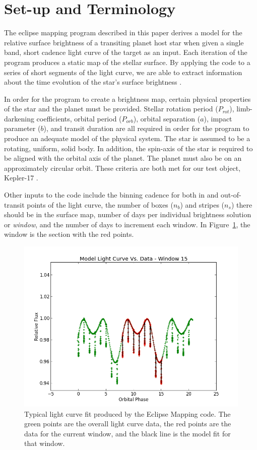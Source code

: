 

\section{Set-up and Terminology \label{terminology}}
The eclipse mapping program described in this paper derives a model for the relative surface brightness of a transiting planet host star when given a single band, short cadence light curve of the target as an input. Each iteration of the program produces a static map of the stellar surface. By applying the code to a series of short segments of the light curve, we are able to extract information about the time evolution of the star's surface brightness \citep{Huber2009}.  

In order for the program to create a brightness map, certain physical properties of the star and the planet must be provided. Stellar rotation period ($P_{rot}$), limb-darkening coefficients, orbital period ($P_{orb}$), orbital separation ($a$), impact parameter ($b$), and transit duration are all required in order for the program to produce an adequate model of the physical system. The star is assumed to be a rotating, uniform, solid body. In addition, the spin-axis of the star is required to be aligned with the orbital axis of the planet. The planet must also be on an approximately circular orbit. These criteria are both met for our test object, Kepler-17 \citep{Borucki2011}.

Other inputs to the code include the binning cadence for both in and out-of-transit points of the light curve, the number of boxes ($n_b$) and stripes ($n_s$) there should be in the surface map, number of days per individual brightness solution or {\it window}, and the number of days to increment each window. In Figure~\ref{LC_Fit}, the window is the section with the red points.

\begin{figure}[h]
	\centering
	\includegraphics[width=.5\textwidth]{images/2b_2s/14_noise/model_fit_w15.png}
	\caption{Typical light curve fit produced by the Eclipse Mapping code. The green points are the overall light curve data, the red points are the data for the current window, and the black line is the model fit for that window.}
	\label{LC_Fit}
\end{figure}

